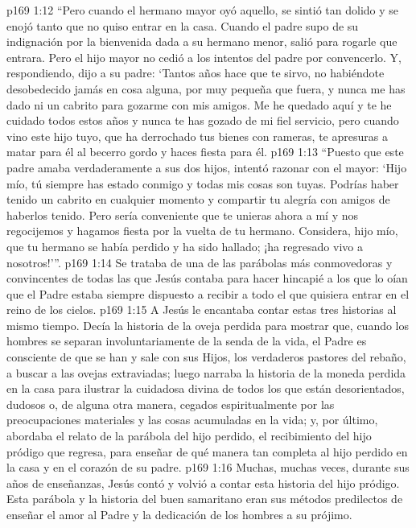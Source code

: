\vs p169 1:12 “Pero cuando el hermano mayor oyó aquello, se sintió tan dolido y se enojó tanto que no quiso entrar en la casa. Cuando el padre supo de su indignación por la bienvenida dada a su hermano menor, salió para rogarle que entrara. Pero el hijo mayor no cedió a los intentos del padre por convencerlo. Y, respondiendo, dijo a su padre: ‘Tantos años hace que te sirvo, no habiéndote desobedecido jamás en cosa alguna, por muy pequeña que fuera, y nunca me has dado ni un cabrito para gozarme con mis amigos. Me he quedado aquí y te he cuidado todos estos años y nunca te has gozado de mi fiel servicio, pero cuando vino este hijo tuyo, que ha derrochado tus bienes con rameras, te apresuras a matar para él al becerro gordo y haces fiesta para él.
\vs p169 1:13 “Puesto que este padre amaba verdaderamente a sus dos hijos, intentó razonar con el mayor: ‘Hijo mío, tú siempre has estado conmigo y todas mis cosas son tuyas. Podrías haber tenido un cabrito en cualquier momento y compartir tu alegría con amigos de haberlos tenido. Pero sería conveniente que te unieras ahora a mí y nos regocijemos y hagamos fiesta por la vuelta de tu hermano. Considera, hijo mío, que tu hermano se había perdido y ha sido hallado; ¡ha regresado vivo a nosotros!’”.
\vs p169 1:14 \pc Se trataba de una de las parábolas más conmovedoras y convincentes de todas las que Jesús contaba para hacer hincapié a los que lo oían que el Padre estaba siempre dispuesto a recibir a todo el que quisiera entrar en el reino de los cielos.
\vs p169 1:15 A Jesús le encantaba contar estas tres historias al mismo tiempo. Decía la historia de la oveja perdida para mostrar que, cuando los hombres se separan involuntariamente de la senda de la vida, el Padre es consciente de que se han  y sale con sus Hijos, los verdaderos pastores del rebaño, a buscar a las ovejas extraviadas; luego narraba la historia de la moneda perdida en la casa para ilustrar la cuidadosa  divina de todos los que están desorientados, dudosos o, de alguna otra manera, cegados espiritualmente por las preocupaciones materiales y las cosas acumuladas en la vida; y, por último, abordaba el relato de la parábola del hijo perdido, el recibimiento del hijo pródigo que regresa, para enseñar de qué manera tan completa  al hijo perdido en la casa y en el corazón de su padre.
\vs p169 1:16 Muchas, muchas veces, durante sus años de enseñanzas, Jesús contó y volvió a contar esta historia del hijo pródigo. Esta parábola y la historia del buen samaritano eran sus métodos predilectos de enseñar el amor al Padre y la dedicación de los hombres a su prójimo.
